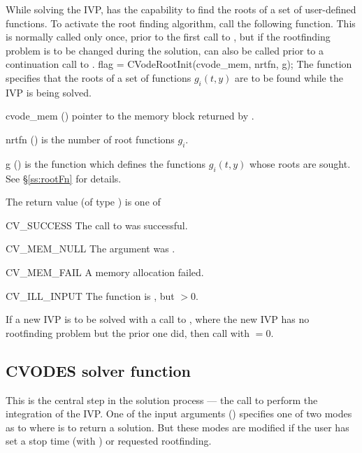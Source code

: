 While solving the IVP, {\cvodes} has the capability to find the
roots of a set of user-defined functions. To activate the root finding
algorithm, call the following function.  This is normally called only
once, prior to the first call to , but if the rootfinding
problem is to be changed during the solution,  can also
be called prior to a continuation call to .
{
  flag = CVodeRootInit(cvode\_mem, nrtfn, g);
}
{
  The function  specifies that the roots of a set of
  functions $g_i(t,y)$ are to be found while the IVP is being solved.
}
{
  \begin{args}
  \item[cvode\_mem] ()
    pointer to the {\cvodes} memory block returned by .
  \item[nrtfn] ()
    is the number of root functions $g_i$.
  \item[g] ()
    is the {\CC} function which defines the  functions $g_i(t,y)$
    whose roots are sought. See \S\ref{ss:rootFn} for details.
 \end{args}
}
{
  The return value  (of type ) is one of
  \begin{args}
  \item[CV\_SUCCESS]
    The call to  was successful.
  \item[CV\_MEM\_NULL]
    The  argument was .
  \item[CV\_MEM\_FAIL]
    A memory allocation failed.
  \item[CV\_ILL\_INPUT]
    The function  is , but  $ > 0$.
  \end{args}
}
{
  If a new IVP is to be solved with a call to , where the new
  IVP has no rootfinding problem but the prior one did, then call
   with $=0$.
}


\subsection{CVODES solver function}\label{sss:cvode}

This is the central step in the solution process --- the call to
perform the integration of the IVP.  One of the input arguments ()
specifies one of two modes as to where {\cvodes} is to return a solution.
But these modes are modified if the user has set a stop time (with
) or requested rootfinding.

